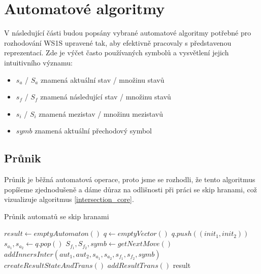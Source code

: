 \section{Automatové algoritmy}

V následující části budou popsány vybrané automatové algoritmy potřebné pro rozhodování WS1S upravené tak, aby efektivně pracovaly s představenou reprezentací. Zde je výčet často používaných symbolů a vysvětlení jejich intuitivního významu:

\begin{itemize}
    \item $s_a$ / $S_a$ znamená aktuální stav / množinu stavů
    \item $s_f$ / $S_f$ znamená následující stav / množinu stavů
    \item $s_i$ / $S_i$ znamená mezistav / množinu mezistavů
    \item $symb$ znamená aktuální přechodový symbol
\end{itemize}

\subsection{Průnik}

Průnik je běžná automatová operace, proto jsme se rozhodli, že tento algoritmus popíšeme zjednodušeně a dáme důraz na odlišnosti při práci se skip hranami, což vizualizuje algoritmus \ref{intersection_core}. 

\begin{algorithm}[t]
    \caption{Průnik automatů se skip hranami}
    \label{intersection_core}
        \begin{algorithmic}[1]
                \State $result \gets emptyAutomaton()$
                \State $q \gets emptyVector()$
                        \State $q.push((init_1,init_2))$
                    \EndFor
                \EndFor
                    \State $s_{a_1},s_{a_2} \gets q.pop()$
                        \State $S_{f_1},S_{f_2},symb \gets getNextMove()$
                                \State $addInnersInter(aut_1,aut_2,s_{a_1},s_{a_2},s_{f_1},s_{f_2},symb)$
                                \State $createResultStateAndTrans()$
                            \EndFor
                        \EndFor
                        \State $addResultTrans()$
                    \EndWhile
                \EndWhile
                \State \Return result
            \EndProcedure
        \end{algorithmic}
\end{algorithm}

